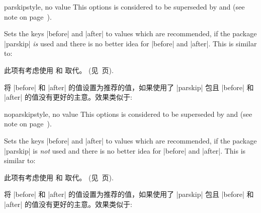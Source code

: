 
\begin{docTcbKey}[][doc updated=2017-02-01]{parskip}{}{style, no value}
This options is considered to be superseded by
 and 
(see note on page~\pageref{subsec:surroundings}).\par
Sets the keys |before| and |after| to values which are
recommended, if the package |parskip| \emph{is} used and there is no better
idea for |before| and |after|. This is similar to:

此项有考虑使用  和  取代。
(见~\pageref{subsec:surroundings}页).\par
将 |before| 和 |after| 的值设置为推荐的值，如果{使用}了 |parskip| 包且 |before| 和 |after| 的值没有更好的主意。效果类似于:
\begin{dispListing}
\end{dispListing}
\end{docTcbKey}

\begin{docTcbKey}[][doc updated=2017-02-01]{noparskip}{}{style, no value}
This options is considered to be superseded by
 and 
(see note on page~\pageref{subsec:surroundings}).\par
Sets the keys |before| and |after| to values which are
recommended, if the package |parskip| is \emph{not} used and there is no better
idea for |before| and |after|. This is similar to:

此项有考虑使用  和  取代。
(见~\pageref{subsec:surroundings}页).\par
将 |before| 和 |after| 的值设置为推荐的值，如果{使用}了 |parskip| 包且 |before| 和 |after| 的值没有更好的主意。效果类似于:
\begin{dispListing}
\end{dispListing}
\end{docTcbKey}



